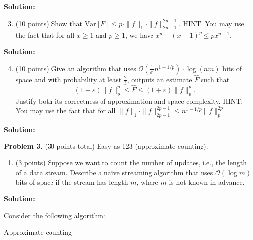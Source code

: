 \documentclass[11pt]{article}
\newcommand{\Var}[1]{\ensuremath{\text{Var}\left[#1\right]}}
\newcommand{\eps}{\varepsilon}
\begin{document}
\noindent\textbf{Solution:}




\begin{enumerate}
\setcounter{enumi}{2}
\item (10 points)
Show that $\Var{F}\le p\cdot\|f\|_1\cdot\|f\|_{2p-1}^{2p-1}$. 
\vskip 0.1in\noindent
HINT: You may use the fact that for all $x\ge 1$ and $p\ge 1$, we have $x^p-(x-1)^p\le px^{p-1}$. 
\end{enumerate}

\noindent\textbf{Solution:}





\begin{enumerate}
\setcounter{enumi}{3}
\item (10 points)
Give an algorithm that uses $\mathcal{O}\left(\frac{1}{\eps^2}n^{1-1/p}\right)\cdot\log(nm)$ bits of space and with probability at least $\frac{2}{3}$, outputs an estimate $\widehat{F}$ such that
\[(1-\eps)\|f\|_p^p\le\widehat{F}\le(1+\eps)\|f\|_p^p.\]
Justify both its correctness-of-approximation and space complexity. 
\vskip 0.1in\noindent
HINT: You may use the fact that for all $\|f\|_1\cdot\|f\|_{2p-1}^{2p-1}\le n^{1-1/p}\|f\|_p^{2p}$. 
\end{enumerate}

\noindent\textbf{Solution:}










\newpage\noindent
\textbf{Problem 3.} (30 points total)
Easy as 123 (approximate counting).
\begin{enumerate}
\item (3 points)
Suppose we want to count the number of updates, i.e., the length of a data stream. 
Describe a na\"{i}ve streaming algorithm that uses $\mathcal{O}(\log m)$ bits of space if the stream has length $m$, where $m$ is not known in advance. 
\end{enumerate}

\noindent\textbf{Solution:}



\vskip 0.1in\noindent
Consider the following algorithm:
\begin{algorithm}[!htb]
\caption{Approximate counting}
\begin{algorithmic}[1]
\EndIf
\EndFor
{}
\end{algorithmic}
\end{algorithm}
\end{document}
